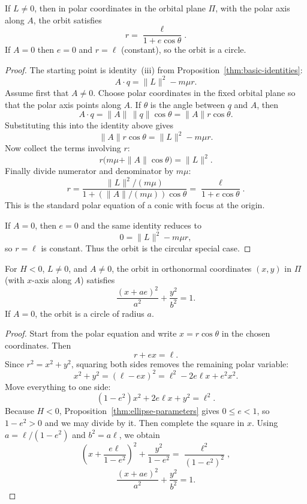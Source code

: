 \begin{theorem}\label{thm:orbit-equation}
If $L \neq 0$, then in polar coordinates in the orbital plane $\Pi$, with the polar axis along $A$, the orbit satisfies
\[
  r = \frac{\ell}{1 + e\cos\theta}.
\]
If $A = 0$ then $e = 0$ and $r = \ell$ (constant), so the orbit is a circle.
\leanok
\begin{proof}
The starting point is identity~(iii) from Proposition~\ref{thm:basic-identities}:
\[
  A \cdot q = \|L\|^2 - m\mu r.
\]
Assume first that $A \neq 0$.
Choose polar coordinates in the fixed orbital plane so that the polar axis points along $A$.
If $\theta$ is the angle between $q$ and $A$, then
\[
  A \cdot q = \|A\|\,\|q\|\cos\theta = \|A\|r\cos\theta.
\]
Substituting this into the identity above gives
\[
  \|A\|r\cos\theta = \|L\|^2 - m\mu r.
\]
Now collect the terms involving $r$:
\[
  r\bigl(m\mu + \|A\|\cos\theta\bigr) = \|L\|^2.
\]
Finally divide numerator and denominator by $m\mu$:
\[
  r = \frac{\|L\|^2/(m\mu)}{1 + (\|A\|/(m\mu))\cos\theta} = \frac{\ell}{1 + e\cos\theta}.
\]
This is the standard polar equation of a conic with focus at the origin.

If $A = 0$, then $e = 0$ and the same identity reduces to
\[
  0 = \|L\|^2 - m\mu r,
\]
so $r = \ell$ is constant.
Thus the orbit is the circular special case.
\end{proof}
\end{theorem}

\begin{theorem}\label{thm:cartesian-ellipse}
For $H < 0$, $L \neq 0$, and $A \neq 0$, the orbit in orthonormal coordinates $(x, y)$ in $\Pi$ (with $x$-axis along $A$) satisfies
\[
  \frac{(x + ae)^2}{a^2} + \frac{y^2}{b^2} = 1.
\]
If $A = 0$, the orbit is a circle of radius $a$.
\leanok
\begin{proof}
Start from the polar equation and write $x = r\cos\theta$ in the chosen coordinates.
Then
\[
  r + ex = \ell.
\]
Since $r^2 = x^2 + y^2$, squaring both sides removes the remaining polar variable:
\[
  x^2 + y^2 = (\ell - ex)^2 = \ell^2 - 2e\ell x + e^2 x^2.
\]
Move everything to one side:
\[
  (1 - e^2)x^2 + 2e\ell x + y^2 = \ell^2.
\]
Because $H < 0$, Proposition~\ref{thm:ellipse-parameters} gives $0 \le e < 1$, so $1-e^2 > 0$ and we may divide by it.
Then complete the square in $x$.
Using $a = \ell/(1-e^2)$ and $b^2 = a\ell$, we obtain
\[
  \left(x + \frac{e\ell}{1-e^2}\right)^2 + \frac{y^2}{1-e^2} = \frac{\ell^2}{(1-e^2)^2},
\]
\[
  \frac{(x + ae)^2}{a^2} + \frac{y^2}{b^2} = 1.
\]
\end{proof}
\end{theorem}

